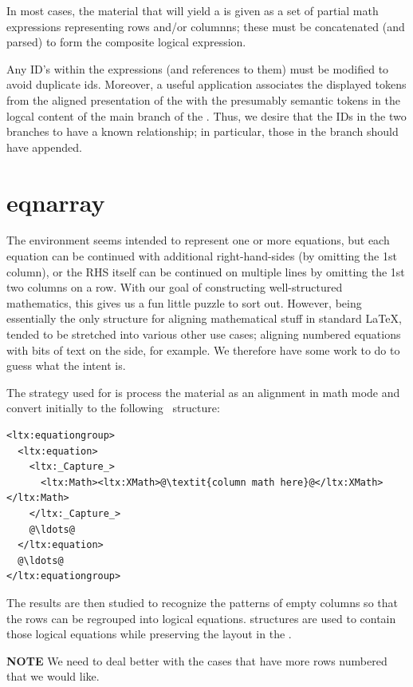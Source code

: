 \documentclass{book}
\begin{document}
In most cases, the material that will yield a 
is given as a set of partial math expressions representing rows and/or columnns;
these must be concatenated (and parsed) to form the composite logical expression.

Any ID's within the expressions (and references to them) must be modified
to avoid duplicate ids.  Moreover, a useful application associates the
displayed tokens from the aligned presentation of the 
with the presumably semantic tokens in the logcal content of the main branch
of the .  Thus, we desire that the IDs in the two
branches to have a known relationship; in particular, those in the branch
should have  appended.


\section{eqnarray}\label{eqnarray}
The  environment seems intended to represent one or more
equations, but each equation can be continued with additional right-hand-sides
(by omitting the 1st column), or the RHS itself can be continued on multiple
lines by omitting the 1st two columns on a row.
With our goal of constructing well-structured mathematics, this gives us
a fun little puzzle to sort out. 
However, being essentially the only structure for aligning mathematical
stuff in standard \LaTeX,  tended to be stretched
into various other use cases; aligning numbered equations with bits of text on the side,
for example.  We therefore have some work to do to guess what the intent is.

The strategy used for  is process the material as
an alignment in math mode and convert initially to the following \XML\ structure:
\begin{lstlisting}[style=xml]
<ltx:equationgroup>
  <ltx:equation>
    <ltx:_Capture_>
      <ltx:Math><ltx:XMath>@\textit{column math here}@</ltx:XMath></ltx:Math>
    </ltx:_Capture_>
    @\ldots@
  </ltx:equation>
  @\ldots@
</ltx:equationgroup>
\end{lstlisting}
The results are then studied to recognize the patterns of empty columns
so that the rows can be regrouped into logical equations.  
structures are used to contain those logical equations while preserving
the layout in the .

\textbf{NOTE} We need to deal better with the cases that have more
rows numbered that we would like.
\end{document}
